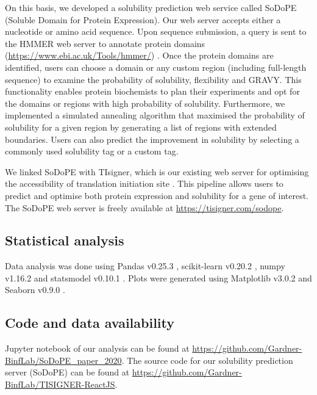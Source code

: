 On this basis, we developed a solubility prediction web service called SoDoPE (Soluble Domain for Protein Expression). Our web server accepts either a nucleotide or amino acid sequence. Upon sequence submission, a query is sent to the HMMER web server to annotate protein domains (\href{https://www.ebi.ac.uk/Tools/hmmer/}{https://www.ebi.ac.uk/Tools/hmmer/}) \citep{Potter2018-ox}. Once the protein domains are identified, users can choose a domain or any custom region (including full-length sequence) to examine the probability of solubility, flexibility and GRAVY. This functionality enables protein biochemists to plan their experiments and opt for the domains or regions with high probability of solubility. Furthermore, we implemented a simulated annealing algorithm that maximised the probability of solubility for a given region by generating a list of regions with extended boundaries. Users can also predict the improvement in solubility by selecting a commonly used solubility tag or a custom tag.

We linked SoDoPE with TIsigner, which is our existing web server for optimising the accessibility of translation initiation site \citep{Bhandari2021-wd}. This pipeline allows users to predict and optimise both protein expression and solubility for a gene of interest. The SoDoPE web server is freely available at \href{https://tisigner.com/sodope}{https://tisigner.com/sodope}.

\subsection{Statistical analysis}
Data analysis was done using Pandas v0.25.3 \citep{McKinney2010-rg}, scikit-learn v0.20.2 \citep{Pedregosa2011-cd}, numpy v1.16.2 \citep{Van_der_Walt2011-hv} and statsmodel v0.10.1 \citep{Seabold2010-qk}. Plots were generated using Matplotlib v3.0.2 \citep{Caswell2018-pc} and Seaborn v0.9.0 \citep{Waskom2014-ar}. 


\subsection{Code and data availability}
Jupyter notebook of our analysis can be found at \href{https://github.com/Gardner-BinfLab/SoDoPE\_paper\_2020}{https://github.com/Gardner-BinfLab/SoDoPE\_paper\_2020}. The source code for our solubility prediction server (SoDoPE) can be found at \href{https://github.com/Gardner-BinfLab/TISIGNER-ReactJS}{https://github.com/Gardner-BinfLab/TISIGNER-ReactJS}.

